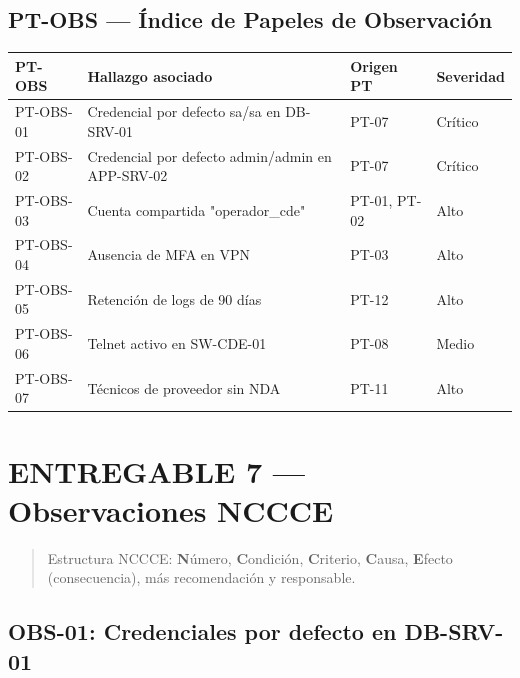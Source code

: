 \documentclass[11pt,a4paper]{article}
\begin{document}
\subsection{PT-OBS — Índice de Papeles de Observación}

\begin{tabularx}{\textwidth}{P{2.5cm}P{3cm}P{2.5cm}L}
\toprule
\textbf{PT-OBS} & \textbf{Hallazgo asociado} & \textbf{Origen PT} & \textbf{Severidad} \\
\midrule
PT-OBS-01 & Credencial por defecto sa/sa en DB-SRV-01 & PT-07 & Crítico \\
PT-OBS-02 & Credencial por defecto admin/admin en APP-SRV-02 & PT-07 & Crítico \\
PT-OBS-03 & Cuenta compartida "operador_cde" & PT-01, PT-02 & Alto \\
PT-OBS-04 & Ausencia de MFA en VPN & PT-03 & Alto \\
PT-OBS-05 & Retención de logs de 90 días & PT-12 & Alto \\
PT-OBS-06 & Telnet activo en SW-CDE-01 & PT-08 & Medio \\
PT-OBS-07 & Técnicos de proveedor sin NDA & PT-11 & Alto \\
\bottomrule
\end{tabularx}

\clearpage

\section{ENTREGABLE 7 — Observaciones NCCCE}

\begin{quote}
Estructura NCCCE: \textbf{N}úmero, \textbf{C}ondición, \textbf{C}riterio, \textbf{C}ausa, \textbf{E}fecto (consecuencia), más recomendación y responsable.
\end{quote}

\subsection{OBS-01: Credenciales por defecto en DB-SRV-01}
\end{document}
